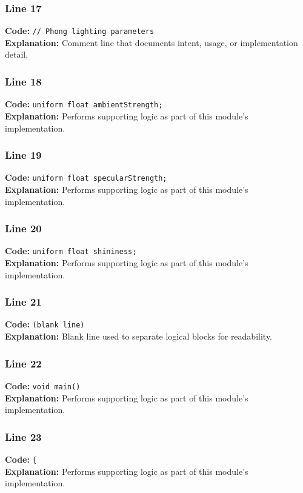 \documentclass[11pt,a4paper]{article}
\begin{document}
\subsubsection*{Line 17}
\textbf{Code:} \verb|// Phong lighting parameters|\\
\textbf{Explanation:} Comment line that documents intent, usage, or implementation detail.

\subsubsection*{Line 18}
\textbf{Code:} \verb|uniform float ambientStrength;|\\
\textbf{Explanation:} Performs supporting logic as part of this module's implementation.

\subsubsection*{Line 19}
\textbf{Code:} \verb|uniform float specularStrength;|\\
\textbf{Explanation:} Performs supporting logic as part of this module's implementation.

\subsubsection*{Line 20}
\textbf{Code:} \verb|uniform float shininess;|\\
\textbf{Explanation:} Performs supporting logic as part of this module's implementation.

\subsubsection*{Line 21}
\textbf{Code:} \texttt{(blank line)}\\
\textbf{Explanation:} Blank line used to separate logical blocks for readability.

\subsubsection*{Line 22}
\textbf{Code:} \verb|void main()|\\
\textbf{Explanation:} Performs supporting logic as part of this module's implementation.

\subsubsection*{Line 23}
\textbf{Code:} \verb|{|\\
\textbf{Explanation:} Performs supporting logic as part of this module's implementation.
\end{document}
